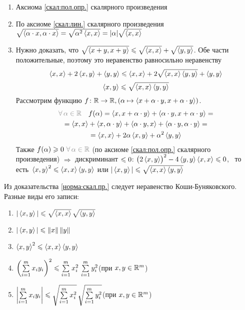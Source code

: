 \begin{prf}
	\begin{enumerate}
		\item Аксиома \ref{скал:пол.опр.} скалярного произведения
		
		\item По аксиоме \ref{скал:лин.} скалярного произведения $\sqrt{\left<\alpha \cdot x, \alpha \cdot x\right>} = \sqrt{\alpha^2\left<x, x\right>} = |\alpha|\sqrt{\left<x, x\right>} $
		
		\item Нужно доказать, что 
		$\sqrt{\left<x + y, x + y\right>} \leqslant \sqrt{\left<x, x\right>} + \sqrt{\left<y, y\right>}$. Обе части положительные, поэтому это неравенство равносильно неравенству
		\[\left<x, x\right> + 2\left<x, y\right> + \left<y, y\right> \leqslant \left<x, x\right> + 2\sqrt{\left<x, x\right>\left<y, y\right>} + \left<y, y\right>\]
		\[\left<x, y\right> \leqslant \sqrt{\left<x, x\right>\left<y, y\right>}\]
		Рассмотрим функцию $f \colon \mathbb R \to \mathbb R, (\alpha \mapsto \left<x + \alpha \cdot y, x + \alpha \cdot y\right>)$. 
		\begin{multline*}
			\uns{\A \alpha \in \rr} \quad f(\alpha) = \scal{x, x + \alpha \cdot y} + \scal{\alpha \cdot y, x + \alpha \cdot y} = \\ 
			= \scal{x, x} + \scal{x, \alpha \cdot y} + \scal{\alpha \cdot y, x} + \scal{\alpha \cdot y, \alpha \cdot y} =\\ 
			= \scal{x, x} + 2 \alpha \scal{x, y} + \alpha^2 \scal{y, y} 
		\end{multline*}
		Также $f(\alpha) \biger 0\ \uns{\A \alpha \in \rr}$ (по аксиоме \ref{скал:пол.опр.} скалярного произведения) $\Rightarrow$ дискриминант $\leqslant 0$:
		$\bigl(2\left<x, y\right>\bigr)^2 - 4\left<y, y\right>\left<x, x\right> \leqslant 0$, \, то есть\, $\left<x, y\right>^2 \leqslant \left<x, x\right>\left<y, y\right>$ или $|\left<x, y\right>|\leqslant \sqrt{\left<x, x\right>\left<y, y\right>}$
	\end{enumerate} %
\end{prf}
\pagebreak
\begin{slv}\label{кош.-бун.}
	Из доказательства \ref{норма:скал.пр.} следует неравенство Коши-Буняковского. Разные виды его записи:
	\begin{multicols}{2}
	\begin{enumerate}
		\item $|\left<x, y\right>| \leqslant \sqrt{\left<x, x\right>}\,\sqrt{\left<y, y\right>}$
		
		\item $|\left<x, y\right>|\leqslant \|x\|\, \|y\|$ 
		
		\item $\left<x, y\right>^2 \leqslant \left<x, x\right>\left<y, y\right>$

		\item $\left(\sum\limits_{i=1}^m x_iy_i\right)^2 \leqslant \sum\limits_{i = 1}^m x_i^2 \, \sum\limits_{i = 1}^m y_i^2$\quad(при $x, y \in \mathbb R^m$)
		
		\item  $\left|\sum\limits_{i=1}^m x_iy_i\right| \leqslant \sqrt{\sum\limits_{i = 1}^m x_i^2} \, \sqrt{\sum\limits_{i = 1}^m y_i^2}$\quad(при $x, y \in \mathbb R^m$)
	\end{enumerate}
	\end{multicols}
	
\end{slv}

